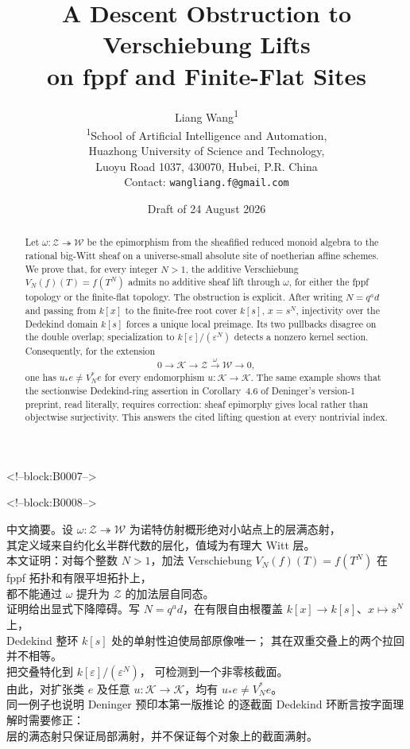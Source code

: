 \documentclass[11pt]{article}
\title{\textbf{A Descent Obstruction to Verschiebung Lifts\\
on fppf and Finite-Flat Sites}}
\author{Liang Wang\textsuperscript{1}\\
\small \textsuperscript{1}School of Artificial Intelligence and Automation,\\
\small Huazhong University of Science and Technology,\\
\small Luoyu Road 1037, 430070, Hubei, P.R. China\\
\small Contact: \texttt{wangliang.f@gmail.com}}
\date{Draft of 24 August 2026}
\theoremstyle{definition}
\newcommand{\latin}[1]{{\rmfamily #1}}
\begin{document}
\maketitle

<!--block:B0007-->
\begin{abstract}
Let \(\omega\colon\mathcal Z\twoheadrightarrow\mathcal W\) be the
epimorphism from the sheafified reduced monoid algebra to the rational
big-Witt sheaf on a universe-small absolute site of noetherian affine
schemes.  We prove that, for every integer \(N>1\), the additive
Verschiebung \(V_N(f)(T)=f(T^N)\) admits no additive sheaf lift through
\(\omega\), for either the fppf topology or the finite-flat topology.
The obstruction is explicit.  After writing \(N=q^a d\) and passing from
\(k[x]\) to the finite-free root cover \(k[s]\), \(x=s^N\), injectivity
over the Dedekind domain \(k[s]\) forces a unique local preimage.  Its two
pullbacks disagree on the double overlap; specialization to
\(k[\varepsilon]/(\varepsilon^N)\) detects a nonzero kernel section.
Consequently, for the extension
\[
0\longrightarrow\mathcal K\longrightarrow\mathcal Z
 \xrightarrow{\omega}\mathcal W\longrightarrow0,
\]
one has \(u_*e\ne V_N^*e\) for every endomorphism
\(u\colon\mathcal K\to\mathcal K\).  The same example shows that the
sectionwise Dedekind-ring assertion in Corollary~4.6 of Deninger's
version-1 preprint, read literally, requires correction: sheaf
epimorphy gives local rather than objectwise surjectivity.
This answers the cited lifting question at every nontrivial index.
\end{abstract}

<!--block:B0008-->
\begin{center}
\begin{minipage}{0.94\textwidth}
{\zhfont\small\RaggedRight
中文摘要。设 \(\omega\colon\mathcal Z\twoheadrightarrow\mathcal W\)
为诺特仿射概形绝对小站点上的层满态射，\\
其定义域来自约化幺半群代数的层化，值域为有理大
\latin{Witt} 层。\\
本文证明：对每个整数 \(N>1\)，加法 \latin{Verschiebung}
\(V_N(f)(T)=f(T^N)\) 在 \latin{fppf} 拓扑和有限平坦拓扑上，\\
都不能通过 \(\omega\) 提升为 \(\mathcal Z\) 的加法层自同态。\\
证明给出显式下降障碍。写 \(N=q^a d\)，在有限自由根覆盖
\(k[x]\to k[s]\)、\(x\mapsto s^N\) 上，\\
\latin{Dedekind} 整环 \(k[s]\) 处的单射性迫使局部原像唯一；
其在双重交叠上的两个拉回并不相等。\\
把交叠特化到 \(k[\varepsilon]/(\varepsilon^N)\)，
可检测到一个非零核截面。\\
由此，对扩张类 \(e\) 及任意
\(u\colon\mathcal K\to\mathcal K\)，均有 \(u_*e\ne V_N^*e\)。\\
同一例子也说明 \latin{Deninger} 预印本第一版推论 \latin{4.6}
的逐截面 \latin{Dedekind} 环断言按字面理解时需要修正：\\
层的满态射只保证局部满射，并不保证每个对象上的截面满射。
}
\end{minipage}
\end{center}
\end{document}
